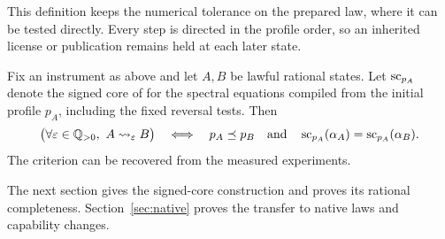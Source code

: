 This definition keeps the numerical tolerance on the prepared law,
where it can be tested directly. Every step is directed in the
profile order, so an inherited license or publication remains held
at each later state.

\begin{theorem}\label{thm:native}
Fix an instrument as above and let \(A,B\) be lawful rational states. Let
\(\operatorname{sc}_{p_A}\) denote the signed core of  for the
spectral equations compiled from the initial profile \(p_A\), including
the fixed reversal tests. Then
\[
 \bigl(\forall \varepsilon\in\QQ_{>0},\ A\leadsto_\varepsilon B\bigr)
 \quad\Longleftrightarrow\quad
 p_A\Refines p_B\quad\text{and}\quad
 \SCore_{p_A}(\alpha_A)=\SCore_{p_A}(\alpha_B).
\]
The criterion can be recovered from the measured experiments.
\end{theorem}

The next section gives the signed-core construction and proves its
rational completeness. Section~\ref{sec:native} proves the transfer
to native laws and capability changes.
